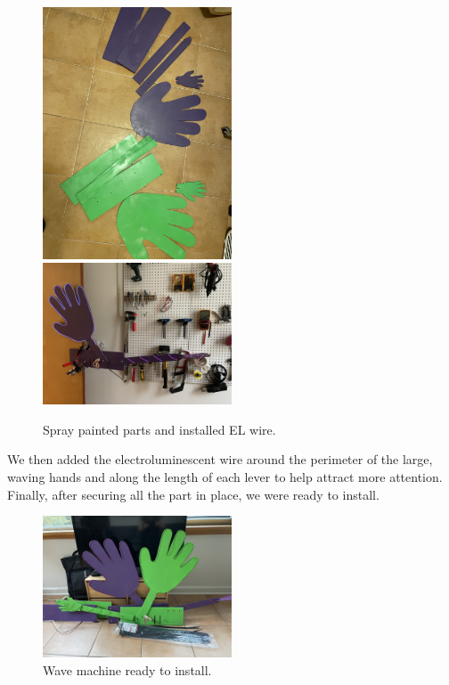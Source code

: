 \documentclass[11pt]{report}
\begin{document}
\begin{figure}[ht!]
\centering
\includegraphics[width=0.5\textwidth]{"images/III/painting.JPG"}
\includegraphics[width=0.5\textwidth]{"images/III/elwire.JPG"}
\caption{Spray painted parts and installed EL wire.}
\end{figure}

We then added the electroluminescent wire around the perimeter of the large, waving hands and along the length of each lever to help attract more attention. Finally, after securing all the part in place, we were ready to install. 

\begin{figure}[ht!]
\centering
\includegraphics[width=0.5\textwidth]{"images/III/readytogo.JPG"}
\caption{Wave machine ready to install.}
\end{figure}
\end{document}
